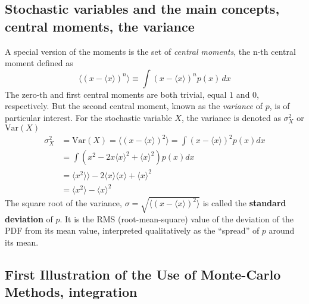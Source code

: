 \documentclass[%
oneside,                 %
final,                   %
10pt]{article}
\newenvironment{block_mdfboxadmon}[1][]{
\begin{block_mdfboxmdframed}[frametitle=#1]
}
{
\end{block_mdfboxmdframed}
}
\begin{document}
\subsection{Stochastic variables and the main concepts, central moments, the variance}

\begin{block_mdfboxadmon}[]

A special version of the moments is the set of \emph{central moments}, the n-th central moment defined as
\begin{equation*}
\langle (x-\langle x\rangle )^n\rangle  \equiv \int\! (x-\langle x\rangle)^n p(x)\,dx
\end{equation*}
The zero-th and first central moments are both trivial, equal $1$ and
$0$, respectively. But the second central moment, known as the
\emph{variance} of $p$, is of particular interest. For the stochastic
variable $X$, the variance is denoted as $\sigma^2_X$ or $\mathrm{Var}(X)$
\begin{align*}
\sigma^2_X &=\mathrm{Var}(X) =  \langle (x-\langle x\rangle)^2\rangle  =
\int (x-\langle x\rangle)^2 p(x)dx\\
& =  \int\left(x^2 - 2 x \langle x\rangle^{2} +\langle x\rangle^2\right)p(x)dx\\
& =  \langle x^2\rangle\rangle - 2 \langle x\rangle\langle x\rangle + \langle x\rangle^2\\
& =  \langle x^2 \rangle - \langle x\rangle^2
\end{align*}
The square root of the variance, $\sigma =\sqrt{\langle (x-\langle x\rangle)^2\rangle}$ is called the 
\textbf{standard deviation} of $p$. It is the RMS (root-mean-square)
value of the deviation of the PDF from its mean value, interpreted
qualitatively as the ``spread'' of $p$ around its mean.
\end{block_mdfboxadmon} %





\subsection{First Illustration of the Use of Monte-Carlo Methods, integration}
\end{document}
